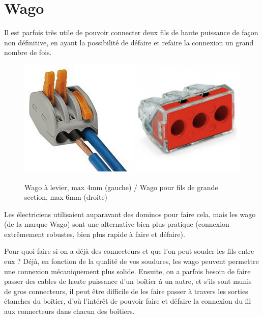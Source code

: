 \documentclass[a4paper, 11pt]{report}
\begin{document}
\section{Wago}

Il est parfois très utile de pouvoir connecter deux fils de haute
puissance de façon non définitive, en ayant la possibilité de défaire
et refaire la connexion un grand nombre de fois.

\begin{figure}[h]
\caption{Wago à levier, max 4mm (gauche) / Wago pour fils
de grande section, max 6mm (droite)}

\centering{}\includegraphics[width=0.5\textwidth]{images/wago_levier.jpg}\includegraphics[width=0.5\textwidth]{images/wago_6mm2.jpg}
\end{figure}

Les électriciens utilisaient auparavant des dominos pour faire cela,
mais les wago (de la marque Wago) sont une alternative bien plus pratique
(connexion extrêmement robustes, bien plus rapide à faire et défaire).

Pour quoi faire si on a déjà des connecteurs et que l'on peut souder
les fils entre eux ? Déjà, en fonction de la qualité de vos soudures,
les wago peuvent permettre une connexion mécaniquement plus solide.
Ensuite, on a parfois besoin de faire passer des cables de haute puissance
d'un boîtier à un autre, et s'ils sont munis de gros connecteurs,
il peut être difficile de les faire passer à travers les sorties étanches
du boîtier, d'où l'intérêt de pouvoir faire et défaire la connexion
du fil aux connecteurs dans chacun des boîtiers.
\end{document}
